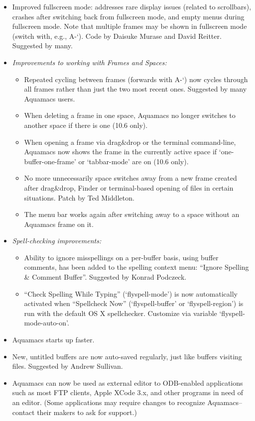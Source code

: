\begin{itemize}
\item Improved fullscreen mode: addresses rare display issues (related to scrollbars), crashes after switching back from fullscreen mode, and empty menus during fullscreen mode.  Note that multiple frames may be shown in fullscreen mode (switch with, e.g.,  A-`).
Code by Daisuke Murase and David Reitter.  Suggested by many.

\item  \emph{Improvements to working with Frames and Spaces:}
\begin{itemize}
\item Repeated cycling between frames (forwards with A-`) now cycles through all frames rather than just the two most recent ones.
Suggested by many Aquamacs users.
\item When deleting a frame in one space, Aquamacs no longer switches to another space if there is one (10.6 only).
\item When opening a frame via drag\&drop or the terminal command-line, Aquamacs now shows the frame in the currently active space if `one-buffer-one-frame' or `tabbar-mode' are on (10.6 only).
\item No more unnecessarily space switches away from a new frame created after drag\&drop, Finder or terminal-based opening of files in certain situations.
Patch by Ted Middleton.
\item The menu bar works again after switching away to a space without an Aquamacs frame on it.
\end{itemize}
\item \emph{Spell-checking improvements:}
\begin{itemize}
\item Ability to ignore misspellings on a per-buffer basis, using buffer comments, has been added to the spelling context menu: ``Ignore Spelling \& Comment Buffer''.  Suggested by Konrad Podczeck.
\item ``Check Spelling While Typing'' (`flyspell-mode') is now automatically activated when ``Spellcheck Now'' (`flyspell-buffer' or `flyspell-region') is run with the default OS X spellchecker.  Customize via variable `flyspell-mode-auto-on'.
\end{itemize}
\item Aquamacs starts up faster.
\item New, untitled buffers are now auto-saved regularly, just like buffers visiting files.
Suggested by Andrew Sullivan.
\item Aquamacs can now be used as external editor to ODB-enabled applications such as most FTP clients, Apple XCode 3.x, and other programs in need of an editor.  (Some applications may require changes to recognize Aquamacs--contact their makers to ask for support.)

\end{itemize}
